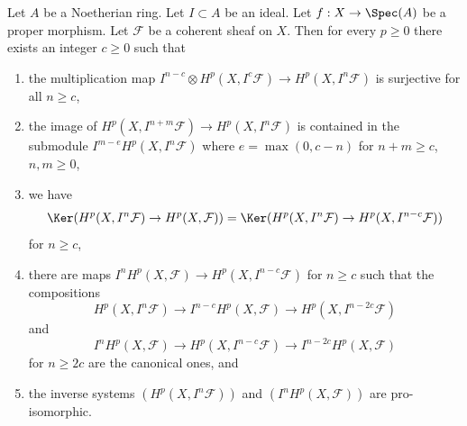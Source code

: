 \begin{lemma}
\label{lemma-cohomology-powers-ideal-application}
Let $A$ be a Noetherian ring.
Let $I \subset A$ be an ideal.
Let $f : X \to \Spec(A)$ be a proper morphism.
Let $\mathcal{F}$ be a coherent sheaf on $X$.
Then for every $p \geq 0$ there exists an integer $c \geq 0$
such that
\begin{enumerate}
\item the multiplication map
$I^{n - c} \otimes H^p(X, I^c\mathcal{F}) \to H^p(X, I^n\mathcal{F})$
is surjective for all $n \geq c$,
\item the image of $H^p(X, I^{n + m}\mathcal{F}) \to H^p(X, I^n\mathcal{F})$
is contained in the submodule $I^{m - e} H^p(X, I^n\mathcal{F})$
where $e = \max(0, c - n)$ for $n + m \geq c$, $n, m \geq 0$,
\item we have
$$
\Ker(H^p(X, I^n\mathcal{F}) \to H^p(X, \mathcal{F})) =
\Ker(H^p(X, I^n\mathcal{F}) \to H^p(X, I^{n - c}\mathcal{F}))
$$
for $n \geq c$,
\item there are maps $I^nH^p(X, \mathcal{F}) \to H^p(X, I^{n - c}\mathcal{F})$
for $n \geq c$ such that the compositions
$$
H^p(X, I^n\mathcal{F}) \to 
I^{n - c}H^p(X, \mathcal{F}) \to
H^p(X, I^{n - 2c}\mathcal{F})
$$
and
$$
I^nH^p(X, \mathcal{F}) \to
H^p(X, I^{n - c}\mathcal{F}) \to
I^{n - 2c}H^p(X, \mathcal{F})
$$
for $n \geq 2c$ are the canonical ones, and
\item the inverse systems $(H^p(X, I^n\mathcal{F}))$ and
$(I^nH^p(X, \mathcal{F}))$ are pro-isomorphic.
\end{enumerate}
\end{lemma}

